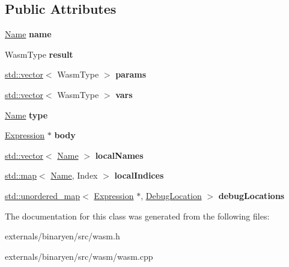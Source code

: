 \subsection*{Public Attributes}
\begin{DoxyCompactItemize}
\item 
\mbox{\label{classwasm_1_1_function_a7460e2e2d9e0462a428e29be1919c966}} 
\mbox{\hyperlink{structwasm_1_1_name}{Name}} {\bfseries name}
\item 
\mbox{\label{classwasm_1_1_function_a139c8e720353f2fa505d92082e06579c}} 
Wasm\+Type {\bfseries result}
\item 
\mbox{\label{classwasm_1_1_function_a5581d882089ee1400c9b80d45eab3b53}} 
\mbox{\hyperlink{classstd_1_1vector}{std\+::vector}}$<$ Wasm\+Type $>$ {\bfseries params}
\item 
\mbox{\label{classwasm_1_1_function_a1d484833dab12c822e6677e5f0f9f359}} 
\mbox{\hyperlink{classstd_1_1vector}{std\+::vector}}$<$ Wasm\+Type $>$ {\bfseries vars}
\item 
\mbox{\label{classwasm_1_1_function_a31ceb53949d3ad0753e7adf4878c01e3}} 
\mbox{\hyperlink{structwasm_1_1_name}{Name}} {\bfseries type}
\item 
\mbox{\label{classwasm_1_1_function_a89c7783c31d07986a4703e43c61dfe8d}} 
\mbox{\hyperlink{classwasm_1_1_expression}{Expression}} $\ast$ {\bfseries body}
\item 
\mbox{\label{classwasm_1_1_function_adc1fa5961664fb4939cb67f2816a29df}} 
\mbox{\hyperlink{classstd_1_1vector}{std\+::vector}}$<$ \mbox{\hyperlink{structwasm_1_1_name}{Name}} $>$ {\bfseries local\+Names}
\item 
\mbox{\label{classwasm_1_1_function_a3356ce2e2221726bb62c56548027ea60}} 
\mbox{\hyperlink{classstd_1_1map}{std\+::map}}$<$ \mbox{\hyperlink{structwasm_1_1_name}{Name}}, Index $>$ {\bfseries local\+Indices}
\item 
\mbox{\label{classwasm_1_1_function_ad9abf51d2661dfa3e706c4b123719f1b}} 
\mbox{\hyperlink{classstd_1_1unordered__map}{std\+::unordered\+\_\+map}}$<$ \mbox{\hyperlink{classwasm_1_1_expression}{Expression}} $\ast$, \mbox{\hyperlink{structwasm_1_1_function_1_1_debug_location}{Debug\+Location}} $>$ {\bfseries debug\+Locations}
\end{DoxyCompactItemize}


The documentation for this class was generated from the following files\+:\begin{DoxyCompactItemize}
\item 
externals/binaryen/src/wasm.\+h\item 
externals/binaryen/src/wasm/wasm.\+cpp\end{DoxyCompactItemize}
